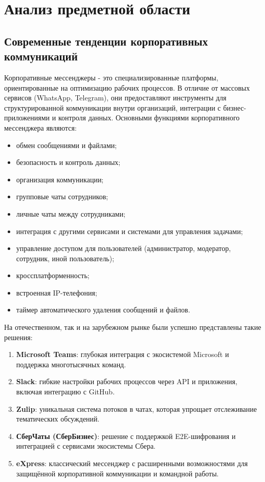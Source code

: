 \section{Анализ предметной области}
\subsection{Современные тенденции корпоративных коммуникаций}

Корпоративные мессенджеры - это специализированные платформы, ориентированные на оптимизацию рабочих процессов. В отличие от массовых сервисов (WhatsApp, Telegram), они предоставляют инструменты для структурированной коммуникации внутри организаций, интеграции с бизнес-приложениями и контроля данных.
Основными функциями корпоративного мессенджера являются:
\begin{itemize}
	\item обмен сообщениями и файлами;
	\item безопасность и контроль данных;
	\item организация коммуникации;
	\item групповые чаты сотрудников;
	\item личные чаты между сотрудниками;
	\item интеграция с другими сервисами и системами для управления задачами;
	\item управление доступом для пользователей (администратор, модератор, сотрудник, иной пользователь);
	\item кроссплатформенность;
	\item встроенная IP-телефония;
	\item таймер автоматического удаления сообщений и файлов.
\end{itemize}


На отечественном, так и на зарубежном рынке были успешно представлены такие решения:
\begin{enumerate}
	\item \textbf {Microsoft Teams}: глубокая интеграция с экосистемой Microsoft и поддержка многотысячных команд.
	\item \textbf {Slack}: гибкие настройки рабочих процессов через API и приложения, включая интеграцию с GitHub.
	\item \textbf {Zulip}: уникальная система потоков в чатах, которая упрощает отслеживание тематических обсуждений.
	\item \textbf {СберЧаты (СберБизнес)}: решение с поддержкой E2E-шифрования и интеграцией с сервисами экосистемы Сбера.
	\item \textbf {eXpress}: классический мессенджер с расширенными возможностями для защищённой корпоративной коммуникации и командной работы.
\end{enumerate}


